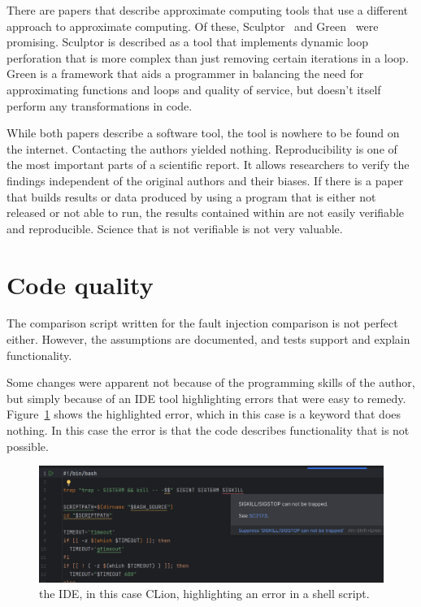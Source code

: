 There are papers that describe approximate computing tools that use a different approach to approximate computing. Of these, Sculptor~\citep{li2018sculptor} and Green~\citep{baek2010green} were promising. Sculptor is described as a tool that implements dynamic loop perforation that is more complex than just removing certain iterations in a loop. Green is a framework that aids a programmer in balancing the need for approximating functions and loops and quality of service, but doesn't itself perform any transformations in code. 

While both papers describe a software tool, the tool is nowhere to be found on the internet. Contacting the authors yielded nothing. 
Reproducibility is one of the most important parts of a scientific report.
It allows researchers to verify the findings independent of the original authors and their biases.
If there is a paper that builds results or data produced by using a program that is either not released or not able to run, the results contained within are not easily verifiable and reproducible. Science that is not verifiable is not very valuable.

\section{Code quality}

The comparison script written for the fault injection comparison is not perfect either. However, the assumptions are documented, and tests support and explain functionality. 

Some changes were apparent not because of the programming skills of the author, but simply because of an IDE tool highlighting errors that were easy to remedy. Figure~\ref{fig:IDE_highlighting} shows the highlighted error, which in this case is a keyword that does nothing. In this case the error is that the code describes functionality that is not possible.

\begin{figure}[h]
    \centering
    \includegraphics[width=\linewidth]{Images/IDE_highlighting.png}
    \caption{the IDE, in this case CLion, highlighting an error in a shell script.}
    \label{fig:IDE_highlighting}
\end{figure}

